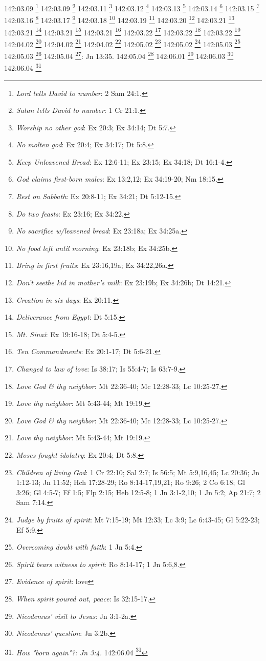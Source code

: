 {{{{{{{{{{{{{{{{{{{{{{{{{{{142:03.09 \footnote{\textit{Lord tells David to number}: 2 Sam 24:1.}
142:03.09 \footnote{\textit{Satan tells David to number}: 1 Cr 21:1.}
142:03.11 \footnote{\textit{Worship no other god}: Ex 20:3; Ex 34:14; Dt 5:7.}
142:03.12 \footnote{\textit{No molten god}: Ex 20:4; Ex 34:17; Dt 5:8.}
142:03.13 \footnote{\textit{Keep Unleavened Bread}: Ex 12:6-11; Ex 23:15; Ex 34:18; Dt 16:1-4.}
142:03.14 \footnote{\textit{God claims first-born males}: Ex 13:2,12; Ex 34:19-20; Nm 18:15.}
142:03.15 \footnote{\textit{Rest on Sabbath}: Ex 20:8-11; Ex 34:21; Dt 5:12-15.}
142:03.16 \footnote{\textit{Do two feasts}: Ex 23:16; Ex 34:22.}
142:03.17 \footnote{\textit{No sacrifice w/leavened bread}: Ex 23:18a; Ex 34:25a.}
142:03.18 \footnote{\textit{No food left until morning}: Ex 23:18b; Ex 34:25b.}
142:03.19 \footnote{\textit{Bring in first fruits}: Ex 23:16,19a; Ex 34:22,26a.}
142:03.20 \footnote{\textit{Don't seethe kid in mother's milk}: Ex 23:19b; Ex 34:26b; Dt 14:21.}
142:03.21 \footnote{\textit{Creation in six days}: Ex 20:11.}
142:03.21 \footnote{\textit{Deliverance from Egypt}: Dt 5:15.}
142:03.21 \footnote{\textit{Mt. Sinai}: Ex 19:16-18; Dt 5:4-5.}
142:03.21 \footnote{\textit{Ten Commandments}: Ex 20:1-17; Dt 5:6-21.}
142:03.22 \footnote{\textit{Changed to law of love}: Is 38:17; Is 55:4-7; Is 63:7-9.}
142:03.22 \footnote{\textit{Love God & thy neighbor}: Mt 22:36-40; Mc 12:28-33; Lc 10:25-27.}
142:03.22 \footnote{\textit{Love thy neighbor}: Mt 5:43-44; Mt 19:19.}
142:04.02 \footnote{\textit{Love God & thy neighbor}: Mt 22:36-40; Mc 12:28-33; Lc 10:25-27.}
142:04.02 \footnote{\textit{Love thy neighbor}: Mt 5:43-44; Mt 19:19.}
142:04.02 \footnote{\textit{Moses fought idolatry}: Ex 20:4; Dt 5:8.}
142:05.02 \footnote{\textit{Children of living God}: 1 Cr 22:10; Sal 2:7; Is 56:5; Mt 5:9,16,45; Lc 20:36; Jn 1:12-13; Jn 11:52; Hch 17:28-29; Ro 8:14-17,19,21; Ro 9:26; 2 Co 6:18; Gl 3:26; Gl 4:5-7; Ef 1:5; Flp 2:15; Heb 12:5-8; 1 Jn 3:1-2,10; 1 Jn 5:2; Ap 21:7; 2 Sam 7:14.}
142:05.02 \footnote{\textit{Judge by fruits of spirit}: Mt 7:15-19; Mt 12:33; Lc 3:9; Lc 6:43-45; Gl 5:22-23; Ef 5:9.}
142:05.03 \footnote{\textit{Overcoming doubt with faith}: 1 Jn 5:4.}
142:05.03 \footnote{\textit{Spirit bears witness to spirit}: Ro 8:14-17; 1 Jn 5:6,8.}
142:05.04 \footnote{\textit{Evidence of spirit}: love}: Jn 13:35.}
142:05.04 \footnote{\textit{When spirit poured out, peace}: Is 32:15-17.}
142:06.01 \footnote{\textit{Nicodemus' visit to Jesus}: Jn 3:1-2a.}
142:06.03 \footnote{\textit{Nicodemus' question}: Jn 3:2b.}
142:06.04 \footnote{\textit{How "born again"?: Jn 3:4.}
142:06.04 \footnote{\textit{Jesus reply}: be "born again": Jn 3:3.}
}}}}}}}}}}}}}}}}}}}}}}}}}}}
